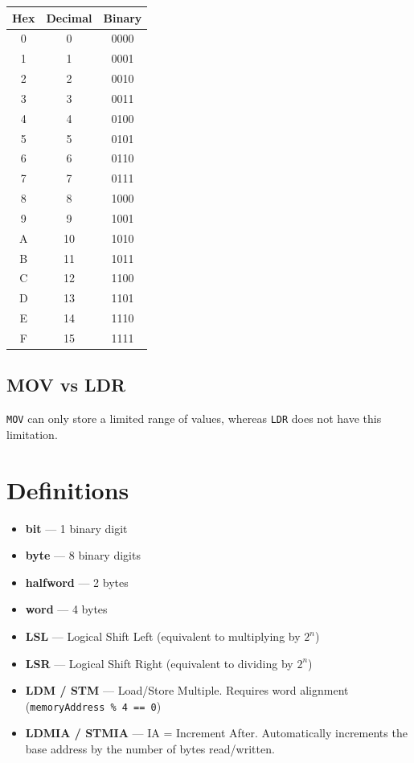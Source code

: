 \documentclass[a4paper, 10pt]{article}
\begin{document}
\begin{center}
\begin{tabular}{ccc}
  \toprule
  Hex & Decimal & Binary \\
  \midrule
  0   & 0       & 0000   \\
  1   & 1       & 0001   \\
  2   & 2       & 0010   \\
  3   & 3       & 0011   \\
  4   & 4       & 0100   \\
  5   & 5       & 0101   \\
  6   & 6       & 0110   \\
  7   & 7       & 0111   \\
  8   & 8       & 1000   \\
  9   & 9       & 1001   \\
  A   & 10      & 1010   \\
  B   & 11      & 1011   \\
  C   & 12      & 1100   \\
  D   & 13      & 1101   \\
  E   & 14      & 1110   \\
  F   & 15      & 1111   \\
  \bottomrule
\end{tabular}
\end{center}

\subsection*{MOV vs LDR}

\texttt{MOV} can only store a limited range of values, whereas \texttt{LDR} does not
have this limitation.

\section{Definitions}

\begin{itemize}
  \item \textbf{bit} --- 1 binary digit
  \item \textbf{byte} --- 8 binary digits
  \item \textbf{halfword} --- 2 bytes
  \item \textbf{word} --- 4 bytes
  \item \textbf{LSL} --- Logical Shift Left (equivalent to multiplying by $2^{n}$)
  \item \textbf{LSR} --- Logical Shift Right (equivalent to dividing by $2^{n}$)
  \item \textbf{LDM / STM} --- Load/Store Multiple. Requires word alignment
        (\texttt{memoryAddress \% 4 == 0})
  \item \textbf{LDMIA / STMIA} --- IA = Increment After. Automatically increments the
        base address by the number of bytes read/written.
\end{itemize}
\end{document}
